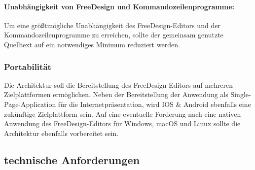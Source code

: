 \paragraph{Unabhängigkeit von FreeDesign und Kommandozeilenprogramme:}
Um eine größtmögliche Unabhängigkeit des FreeDesign-Editors und der Kommandozeilenprogramme zu erreichen, sollte der gemeinsam genutzte Quelltext auf ein notwendiges Minimum reduziert werden.

\subsubsection{Portabilität}
Die Architektur soll die Bereitstellung des FreeDesign-Editors auf mehreren Zielplattformen ermöglichen. Neben der Bereitstellung der Anwendung als Single-Page-Application für die Internetpräsentation, wird IOS \& Android ebenfalls eine zukünftige Zielplattform sein. 
Auf eine eventuelle Forderung nach eine nativen Anwendung des FreeDesign-Editors für Windows, macOS und Linux sollte die Architektur ebenfalls vorbereitet sein. 

\subsection{technische Anforderungen}

